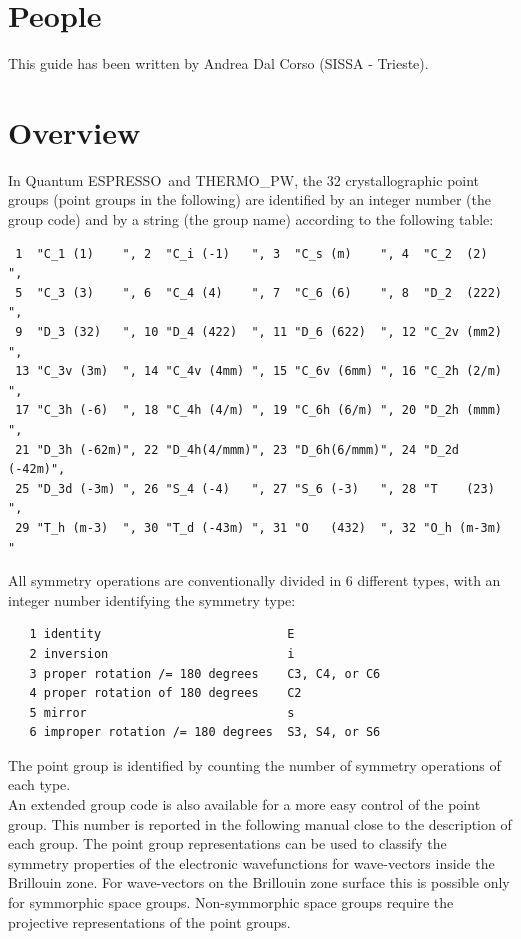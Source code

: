 \documentclass[12pt,a4paper]{article}
\def\qe{{\sc Quantum ESPRESSO}}
\def\tpw{{\sc THERMO\_PW}}
\begin{document}
\newpage
\section{\color{coral}People}
This guide has been written by Andrea Dal Corso (SISSA - Trieste).

\newpage
\section{\color{coral}Overview}
In \qe\ and \tpw, the $32$ crystallographic point groups 
(point groups in the following) are identified by an integer number 
(the group code) and 
by a string (the group name) according to the following table:

\begin{verbatim}
 1  "C_1 (1)    ", 2  "C_i (-1)   ", 3  "C_s (m)    ", 4  "C_2  (2)   ", 
 5  "C_3 (3)    ", 6  "C_4 (4)    ", 7  "C_6 (6)    ", 8  "D_2  (222) ", 
 9  "D_3 (32)   ", 10 "D_4 (422)  ", 11 "D_6 (622)  ", 12 "C_2v (mm2) ", 
 13 "C_3v (3m)  ", 14 "C_4v (4mm) ", 15 "C_6v (6mm) ", 16 "C_2h (2/m) ", 
 17 "C_3h (-6)  ", 18 "C_4h (4/m) ", 19 "C_6h (6/m) ", 20 "D_2h (mmm) ", 
 21 "D_3h (-62m)", 22 "D_4h(4/mmm)", 23 "D_6h(6/mmm)", 24 "D_2d (-42m)", 
 25 "D_3d (-3m) ", 26 "S_4 (-4)   ", 27 "S_6 (-3)   ", 28 "T    (23)  ", 
 29 "T_h (m-3)  ", 30 "T_d (-43m) ", 31 "O   (432)  ", 32 "O_h (m-3m) "  
\end{verbatim}
All symmetry operations are conventionally divided in $6$ 
different types, with an integer number identifying the symmetry type:
\begin{verbatim}
   1 identity                          E
   2 inversion                         i
   3 proper rotation /= 180 degrees    C3, C4, or C6
   4 proper rotation of 180 degrees    C2
   5 mirror                            s
   6 improper rotation /= 180 degrees  S3, S4, or S6
\end{verbatim}
The point group is identified by counting the number of symmetry operations of 
each type. \\
An extended group code is also available for a more easy control of the
point group. This number is reported in the following manual close
to the description of each group.
The point group representations can be used to classify the symmetry properties 
of the electronic wavefunctions for wave-vectors inside the Brillouin zone. 
For wave-vectors on the Brillouin zone surface this is possible only for 
symmorphic space groups. Non-symmorphic space groups require the projective 
representations of the point groups. 
\end{document}
